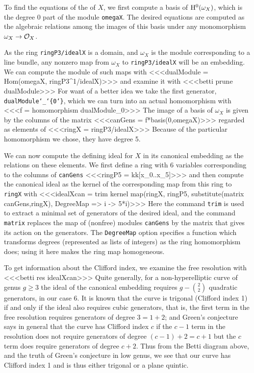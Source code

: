 To find the equations of
the  of $X$, we 
first compute a basis of ${\rm H}^0(\omega_X)$, which
is the degree 0 part of the module {\tt omegaX}.
The desired equations are computed as the algebraic
relations among the images of this basis under any
monomorphism $\omega_X \to {\cal O}_X$.

As the ring {\tt ringP3/idealX} is a domain,
and $\omega_X$ is the module corresponding to
a line bundle, any nonzero map
{}from  $\omega_X$ to {\tt ringP3/idealX}  will be
an embedding. We can compute the module of such maps with
<<<dualModule = Hom(omegaX, ringP3^1/idealX)>>>
and examine it with
<<<betti prune dualModule>>>
For want of a better idea
we take the first generator, {\tt dualModule\char`\_\char`\{0\char`\}}, which
we can turn into an actual homomorphism with
<<<f = homomorphism dualModule_{0}>>>
The image of a basis of $\omega_X$ is
given by the columns of the matrix
<<<canGens = f*basis(0,omegaX)>>>
regarded as elements of 
<<<ringX = ringP3/idealX>>>
Because of the particular homomorphism we chose,
they have degree 5.

We can now compute the defining ideal for $X$ in its canonical
embedding as the relations on these elements. We first define
a ring with 6 variables corresponding to the columns of {\tt canGens}
<<<ringP5 = kk[x_0..x_5]>>>
and then compute the canonical ideal as the
kernel of the corresponding map from
this ring to {\tt ringX} with
<<<idealXcan = trim kernel map(ringX, ringP5, 
                               substitute(matrix canGens,ringX),
                               DegreeMap => i -> 5*i)>>>
Here the command {\tt trim} is used to extract a minimal set
of generators of the desired ideal, and the command {\tt matrix}
replaces the map of (nonfree) modules {\tt canGens} by the matrix that
gives its action on the generators.  The {\tt DegreeMap} option specifies a
function which transforms degrees (represented as lists of integers) as the
ring homomorphism does; using it here makes the ring map homogeneous.

To get information about the Clifford index, we examine the 
{}free resolution with
<<<betti res idealXcan>>>
Quite generally, for a non-hyperelliptic curve of genus 
$g\geq 3$ the ideal
of the canonical embedding requires ${g-\binom 2 2}$ 
quadratic generators, in our case 6. It is known that
the curve is trigonal (Clifford index 1) if and only if the
ideal also requires cubic generators, that is, the
{}first term in the free resolution requires generators of degree
$3 = 1+2$; and Green's conjecture says in general that the
curve has Clifford index $c$ if the $c-1$ term in the
resolution does not require generators of degree
$(c-1)+2 = c+1$ but the $c$ term does require generators
of degree $c+2$. Thus from the Betti diagram above, and
the truth of Green's conjecture in low genus, we
see that our curve has Clifford index 1 and is thus either
trigonal or a plane quintic. 

